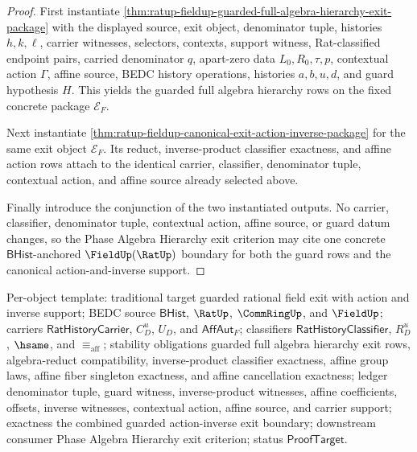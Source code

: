 \begin{proof}
First instantiate
\autoref{thm:ratup-fieldup-guarded-full-algebra-hierarchy-exit-package} with
the displayed source, exit object, denominator tuple, histories $h,k,\ell$,
carrier witnesses, selectors, contexts, support witness, Rat-classified
endpoint pairs, carried denominator $q$, apart-zero data $L_0,R_0,\tau,p$,
contextual action $\Gamma$, affine source, BEDC history operations, histories
$a,b,u,d$, and guard hypothesis $H$. This yields the guarded full algebra
hierarchy rows on the fixed concrete package
$\mathcal E_F$.

Next instantiate
\autoref{thm:ratup-fieldup-canonical-exit-action-inverse-package} for the same
exit object $\mathcal E_F$. Its reduct, inverse-product classifier exactness,
and affine action rows attach to the identical carrier, classifier,
denominator tuple, contextual action, and affine source already selected above.

Finally introduce the conjunction of the two instantiated outputs. No carrier,
classifier, denominator tuple, contextual action, affine source, or guard datum
changes, so the Phase Algebra Hierarchy exit criterion may cite one concrete
$\mathsf{BHist}$-anchored $\FieldUp(\RatUp)$ boundary for both the guard rows
and the canonical action-and-inverse support.
\end{proof}

Per-object template: traditional target guarded rational field exit with
action and inverse support; BEDC source $\mathsf{BHist}$, $\RatUp$,
$\CommRingUp$, and $\FieldUp$; carriers
$\mathsf{RatHistoryCarrier}$, $C_D^u$, $U_D$, and $\mathsf{AffAut}_F$;
classifiers $\mathsf{RatHistoryClassifier}$, $R_D^u$, $\hsame$, and
$\equiv_{\mathrm{aff}}$; stability obligations guarded full algebra hierarchy
exit rows, algebra-reduct compatibility, inverse-product classifier exactness,
affine group laws, affine fiber singleton exactness, and affine cancellation
exactness; ledger denominator tuple, guard witness, inverse-product witnesses,
affine coefficients, offsets, inverse witnesses, contextual action, affine
source, and carrier support; exactness the combined guarded action-inverse exit
boundary; downstream consumer Phase Algebra Hierarchy exit criterion; status
$\mathsf{ProofTarget}$.

